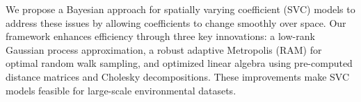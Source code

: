 We propose a Bayesian approach for spatially varying coefficient (SVC) models to address these issues by allowing coefficients to change smoothly over space. Our framework enhances efficiency through three key innovations: a low-rank Gaussian process approximation, a robust adaptive Metropolis (RAM) for optimal random walk sampling, and optimized linear algebra using pre-computed distance matrices and Cholesky decompositions. These improvements make SVC models feasible for large-scale environmental datasets.

% 
% 
